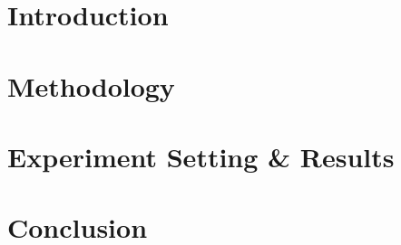 \documentclass[sigconf,nonacm]{acmart}
\begin{document}
\section{Introduction}


% 

\section{Methodology}


\section{Experiment Setting \& Results}


\section{Conclusion}


\begin{acks}

\end{acks}

\clearpage
\balance


\end{document}
